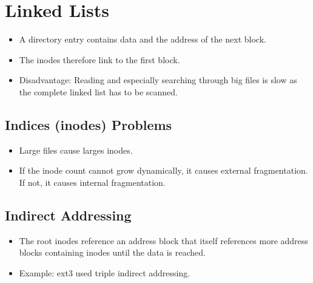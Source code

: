 \documentclass[a4paper, 11pt, accentcolor = tud3b]{tudreport}
\begin{document}
			\section{Linked Lists}
				\begin{itemize}
					\item A directory entry contains data and the address of the next block.
					\item The inodes therefore link to the first block.
					\item Disadvantage: Reading and especially searching through big files is slow as the complete linked list has to be scanned.
				\end{itemize}

	        \subsection{Indices (inodes) Problems}
	            \begin{itemize}
	            	\item Large files cause larges inodes.
	            	\item If the inode count cannot grow dynamically, it causes external fragmentation. If not, it causes internal fragmentation.
	            \end{itemize}
	        
	        \subsection{Indirect Addressing}
		        \begin{itemize}
		        	\item The root inodes reference an address block that itself references more address blocks containing inodes until the data is reached.
		        	\item Example: ext3 used triple indirect addressing.
		        \end{itemize}
	        
\end{document}
